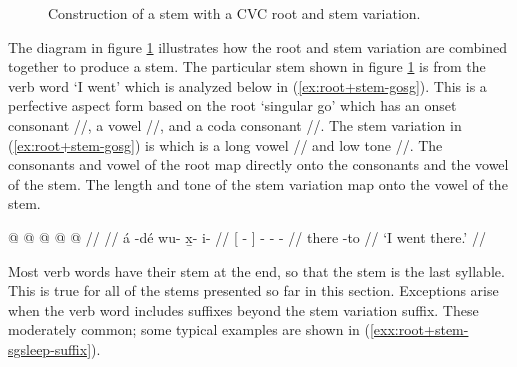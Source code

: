 \begin{figure}
\centerfloat
{}
\caption{Construction of a stem with a CVC root and  stem variation.}
\label{fig:root+stem-example-stem-docking}
\end{figure}

The diagram in figure \ref{fig:root+stem-example-stem-docking} illustrates how the root and stem variation are combined together to produce a stem.
The particular stem shown in figure \ref{fig:root+stem-example-stem-docking} is from the verb word  ‘I went’ which is analyzed below in (\ref{ex:root+stem-gosg}).
This is a perfective aspect form based on the root  ‘singular go’ which has an onset consonant //, a vowel //, and a coda consonant //.
The stem variation in (\ref{ex:root+stem-gosg}) is  which is a long vowel // and low tone //.
The consonants and vowel of the root map directly onto the consonants and the vowel of the stem.
The length and tone of the stem variation map onto the vowel of the stem.

\ex\label{ex:root+stem-gosg}%
%
\begingl
	\gla	{}  @ {} {}  @ {} @ {} @ {} @ {} //
	\glp	{} \llap{[} {} {} \rlap{\ipa{χʷàː.ˈ\gm{kʷùːt}}]} {} {} {} {} //
	\glb	{} á -dé {} wu- x̱- i-   //
	\glc	{}[  - {}] - - -   //
	\gld	{} there -to {}  {} {} {} {} //
	\glft	‘I went there.’
		//
\endgl
\xe

Most verb words have their stem at the end, so that the stem is the last syllable.
This is true for all of the stems presented so far in this section.
Exceptions arise when the verb word includes suffixes beyond the stem variation suffix.
These moderately common; some typical examples are shown in (\ref{exx:root+stem-sgsleep-suffix}).

